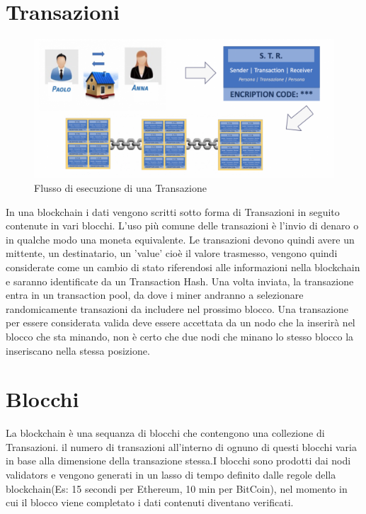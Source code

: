 \documentclass[12pt,titlepage]{report}
\begin{document}
\section{Transazioni}
\begin{figure}[h]
	\includegraphics[width=\textwidth]{flusso_bc}
	\centering
	\caption{Flusso di esecuzione di una Transazione}
	\label{fig:fl_bc}
\end{figure}
In una blockchain i dati vengono scritti sotto forma di Transazioni in seguito contenute in vari blocchi. L'uso più comune delle transazioni è l'invio di denaro o in qualche modo una moneta equivalente. Le transazioni devono quindi avere un mittente, un destinatario, un 'value' cioè il valore trasmesso, vengono quindi considerate come un cambio di stato riferendosi alle informazioni nella blockchain e saranno identificate da un Transaction Hash. Una volta inviata, la transazione entra in un transaction pool, da dove i miner andranno a selezionare randomicamente transazioni da includere nel prossimo blocco. Una transazione per essere considerata valida deve essere accettata da un nodo che la inserirà nel blocco che sta minando, non è certo che due nodi che minano lo stesso blocco la inseriscano nella stessa posizione.

\section{Blocchi}
La blockchain è una sequanza di blocchi che contengono una collezione di Transazioni.  il numero di transazioni all'interno di ognuno di questi blocchi varia in base alla dimensione della transazione stessa.I blocchi sono prodotti dai nodi validators e vengono generati in un lasso di tempo definito dalle regole della blockchain(Es: 15 secondi per Ethereum, 10 min per BitCoin), nel momento in cui il blocco viene completato i dati contenuti diventano verificati.
\end{document}
